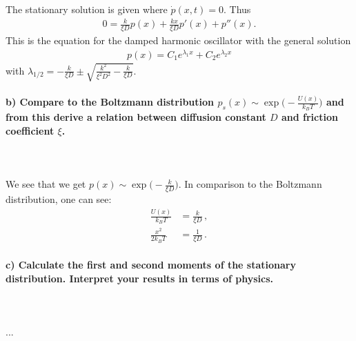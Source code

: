     The stationary solution is given where $\dot{p}(x,t) = 0$. Thus
    \begin{align}
    	0 = \frac{k}{\xi D} p(x) + \frac{kx}{\xi D} p'(x) + p''(x).
    \end{align}
    This is the equation for the damped harmonic oscillator with the general solution
    \begin{align}
    	p(x) = C_1 e^{\lambda_1 x} + C_2 e^{\lambda_2 x}
    \end{align}
    with $\lambda_{1/2} = -\frac{k}{\xi D} \pm \sqrt{\frac{k^2}{\xi^2 D^2} - \frac{k}{\xi D}}$.


\newpage
\paragraph{b) Compare to the Boltzmann distribution 
    $p_s(x)\sim\exp\bigg(-\frac{U(x)}{k_BT}\bigg)$ and from this derive a 
    relation between diffusion constant $D$ and friction coefficient $\xi$.
} \ \\
\\
    We see that we get $p(x)\sim\exp\bigg(-\frac{k}{\xi D}\bigg)$. In comparison to the Boltzmann
    distribution, one can see:
    \begin{align}
    \frac{U(x)}{k_BT} &= \frac{k}{\xi D} \,, \\
    \frac{x^2}{2k_BT} &= \frac{1}{\xi D} \,.
    \end{align}

\paragraph{c) Calculate the first and second moments of the stationary
    distribution. Interpret your results in terms of physics.
} \ \\
\\
    ...

